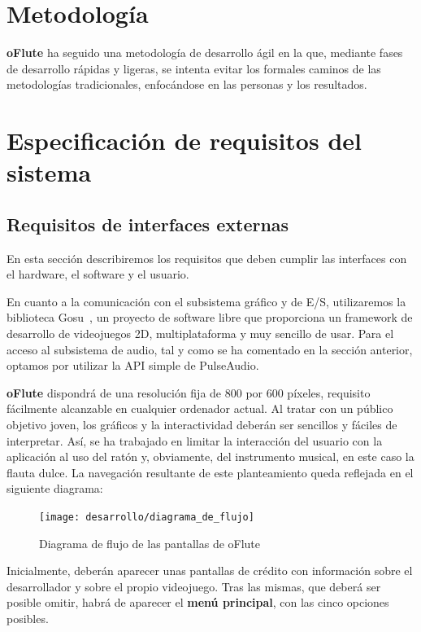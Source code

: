 
\section{Metodología}
\textbf{oFlute} ha seguido una metodología de desarrollo ágil en la que, mediante fases
de desarrollo rápidas y ligeras, se intenta evitar los formales caminos de las
metodologías tradicionales, enfocándose en las personas y los resultados.

\section{Especificación de requisitos del sistema}

\subsection{Requisitos de interfaces externas}
En esta sección describiremos los requisitos que deben cumplir las interfaces
con el hardware, el software y el usuario.

En cuanto a la comunicación con el subsistema gráfico y de E/S, utilizaremos la
biblioteca Gosu~\cite{gosu}, un proyecto de software libre que proporciona un
framework de desarrollo de videojuegos 2D, multiplataforma y muy sencillo de
usar. Para el acceso al subsistema de audio, tal y como se ha comentado en la
sección anterior, optamos por utilizar la API simple de PulseAudio.

\textbf{oFlute} dispondrá de una resolución fija de 800 por 600 píxeles,
requisito fácilmente alcanzable en cualquier ordenador actual. Al tratar con un
público objetivo joven, los gráficos y la interactividad deberán ser sencillos y
fáciles de interpretar. Así, se ha trabajado en limitar la interacción del
usuario con la aplicación al uso del ratón y, obviamente, del instrumento
musical, en este caso la flauta dulce. La navegación resultante de este
planteamiento queda reflejada en el siguiente diagrama:

\begin{figure}[h!]
  \centering
  \texttt{[image: desarrollo/diagrama\_de\_flujo]}
  \caption{Diagrama de flujo de las pantallas de oFlute}
\end{figure}

\pagebreak

Inicialmente, deberán aparecer unas pantallas de crédito con información sobre
el desarrollador y sobre el propio videojuego. Tras las mismas, que deberá ser
posible omitir, habrá de aparecer el \textbf{menú principal}, con las cinco
opciones posibles.

